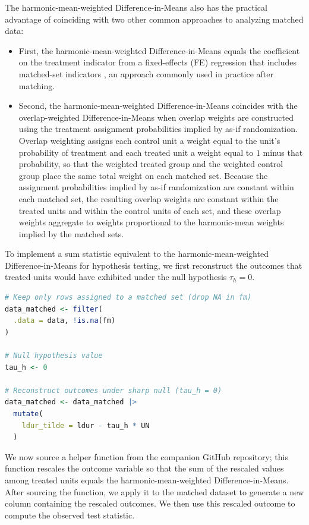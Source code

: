 \documentclass[twoside,11pt]{article}
\begin{document}
The harmonic-mean-weighted Difference-in-Means also has the practical
advantage of coinciding with two other common approaches to analyzing
matched data:

\begin{itemize}
\item
  First, the harmonic-mean-weighted Difference-in-Means equals the
  coefficient on the treatment indicator from a fixed-effects (FE) regression
  that includes matched-set indicators
  \citep[p.~229]{hansenbowers2008}, an approach commonly used in
  practice after matching.
\item
  Second, the harmonic-mean-weighted Difference-in-Means coincides with
  the overlap-weighted Difference-in-Means \citep{lietal2018} when
  overlap weights are constructed using the treatment assignment
  probabilities implied by as-if randomization. Overlap weighting assigns
  each control unit a weight equal to the unit's probability of treatment
  and each treated unit a weight equal to \(1\) minus that probability, so
  that the weighted treated group and the weighted control group place
  the same total weight on each matched set. Because the assignment probabilities implied
  by as-if randomization are constant within each matched set, the
  resulting overlap weights are constant within the treated units and
  within the control units of each set, and these overlap weights
  aggregate to weights proportional to the harmonic-mean weights implied by the matched
  sets.
\end{itemize}

To implement a sum statistic equivalent to the harmonic-mean-weighted
Difference-in-Means for hypothesis testing, we first reconstruct the
outcomes that treated units would have exhibited under the null
hypothesis \(\tau_h = 0\).



\begin{lstlisting}[language=R]
# Keep only rows assigned to a matched set (drop NA in fm)
data_matched <- filter(
  .data = data, !is.na(fm)
)

# Null hypothesis value
tau_h <- 0

# Reconstruct outcomes under sharp null (tau_h = 0)
data_matched <- data_matched |>
  mutate(
    ldur_tilde = ldur - tau_h * UN
  )
\end{lstlisting}



We now source a helper function from the companion GitHub repository;
this function rescales the outcome variable so that the sum of the
rescaled values among treated units equals the harmonic-mean-weighted
Difference-in-Means. After sourcing the function, we apply it to the
matched dataset to generate a new column containing the rescaled
outcomes. We then use this rescaled outcome to compute the observed test
statistic.
\end{document}
